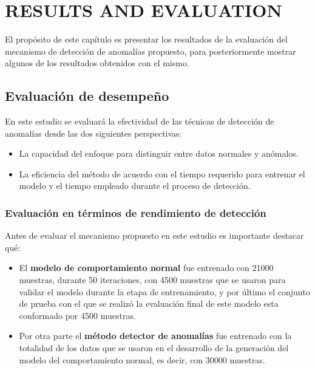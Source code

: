 \chapter{\uppercase{RESULTS AND EVALUATION}}
\label{Capitulo 6}

El prop\'{o}sito de este cap\'{i}tulo es presentar los resultados de la evaluaci\'{o}n del mecanismo de detecci\'{o}n de anomal\'{i}as propuesto, para posteriormente mostrar algunos de los resultados obtenidos con el mismo.

\section{Evaluaci\'{o}n de desempe\~{n}o}

En este estudio se evaluar\'{a} la efectividad de las t\'{e}cnicas de detecci\'{o}n de anomal\'{i}as desde las dos siguientes perspectivas:
\begin{itemize}
\item La capacidad del enfoque para distinguir entre datos normales y an\'{o}malos.
\item La eficiencia del m\'{e}todo de acuerdo con el tiempo requerido para entrenar el modelo y el tiempo empleado durante el proceso de detecci\'{o}n.

\end{itemize}

\subsection{Evaluación en términos de rendimiento de detección}

Antes de evaluar el mecanismo propuesto en este estudio es importante destacar qu\'{e}:

\begin{itemize}
\item El \textbf{modelo de comportamiento normal} fue entrenado con 21000 muestras, durante 50 iteraciones, con 4500 muestras que se usaron para validar el modelo durante la etapa de entrenamiento, y por \'{u}ltimo el conjunto de prueba con el que se realiz\'{o} la evaluaci\'{o}n final de este modelo esta conformado por 4500 muestras.
\item Por otra parte el \textbf{m\'{e}todo detector de anomal\'{i}as} fue entrenado con la totalidad de los datos que se usaron en el desarrollo de la generaci\'{o}n del modelo del comportamiento normal, es decir, con 30000 muestras.
\end{itemize}

